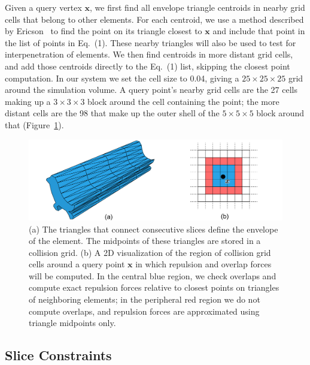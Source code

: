 Given a query vertex $\bm{x}$, we first find all envelope triangle
centroids in nearby grid cells that belong to other elements.  For each 
centroid, we use a method described by Ericson~\cite{Ericson2005} to
find the point on its triangle closest to $\bm{x}$ and
include that point in the list of points in Eq.~(1).  These
nearby triangles will also be used to test for interpenetration of elements.
We then find centroids in more distant grid cells, and add
those centroids directly to the Eq.~(1) list, skipping the closest point computation.
In our system we set the cell size to 0.04, giving a $25\times 25\times 25$
grid around the simulation volume.  A query point's nearby grid cells 
are the 27 cells making up a $3\times 3\times 3$ block around the cell 
containing the point; the more distant cells are the 98 that make up the
outer shell of the $5\times 5\times 5$ block around that 
(Figure~\ref{fig_animationpak_collision_grid}).


\begin{figure}
\centering
\includegraphics[width=1.0\textwidth]{figures/animationpak/collision_grid.pdf} 
\caption[An envelope and a collision grid]
{\label{fig_animationpak_collision_grid} 
(a) The triangles that connect consecutive slices define the envelope of the
element.  The midpoints of these triangles are stored in a collision grid.
(b) A 2D visualization of the region of collision
grid cells around a query point 
$\bm{x}$ 
in which repulsion and overlap forces will be computed.  In the central blue
region, we check overlaps and compute exact repulsion forces relative to
closest points on triangles of neighboring elements; in the peripheral
red region we do not compute overlaps, and repulsion forces are approximated
using triangle midpoints only.}
\end{figure}


\subsection{Slice Constraints}
\label{animationpak_slice_constraints}

